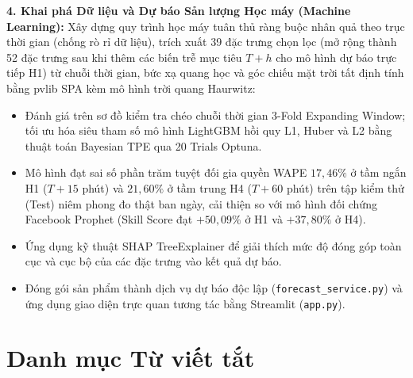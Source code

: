 \documentclass[12pt, a4paper]{report}
\begin{document}
\textbf{4. Khai phá Dữ liệu và Dự báo Sản lượng Học máy (Machine Learning):}
Xây dựng quy trình học máy tuân thủ ràng buộc nhân quả theo trục thời gian (chống rò rỉ dữ liệu), trích xuất 39 đặc trưng chọn lọc (mở rộng thành 52 đặc trưng sau khi thêm các biến trễ mục tiêu $T+h$ cho mô hình dự báo trực tiếp H1) từ chuỗi thời gian, bức xạ quang học và góc chiếu mặt trời tất định tính bằng pvlib SPA kèm mô hình trời quang Haurwitz:
\begin{itemize}[noitemsep]
    \item Đánh giá trên sơ đồ kiểm tra chéo chuỗi thời gian 3-Fold Expanding Window; tối ưu hóa siêu tham số mô hình LightGBM hồi quy L1, Huber và L2 bằng thuật toán Bayesian TPE qua 20 Trials Optuna.
    \item Mô hình đạt sai số phần trăm tuyệt đối gia quyền WAPE $17{,}46\%$ ở tầm ngắn H1 ($T + 15$ phút) và $21{,}60\%$ ở tầm trung H4 ($T + 60$ phút) trên tập kiểm thử (Test) niêm phong đo thật ban ngày, cải thiện so với mô hình đối chứng Facebook Prophet (Skill Score đạt $+50{,}09\%$ ở H1 và $+37{,}80\%$ ở H4).
    \item Ứng dụng kỹ thuật SHAP TreeExplainer để giải thích mức độ đóng góp toàn cục và cục bộ của các đặc trưng vào kết quả dự báo.
    \item Đóng gói sản phẩm thành dịch vụ dự báo độc lập (\texttt{forecast\_service.py}) và ứng dụng giao diện trực quan tương tác bằng Streamlit (\texttt{app.py}).
\end{itemize}

\newpage

\tableofcontents
\listoffigures
\listoftables

\newpage
\chapter*{Danh mục Từ viết tắt}
\vspace*{-15pt}
\end{document}
